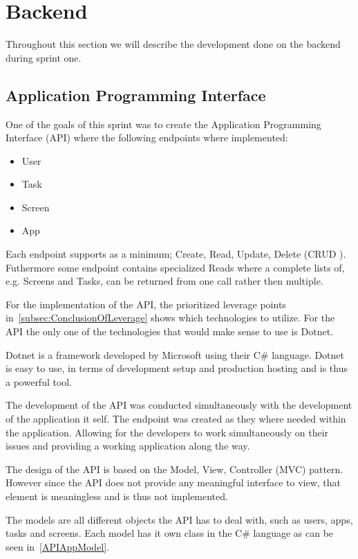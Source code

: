 \section{Backend}

Throughout this section we will describe the development done on the backend during sprint one.

\subsection{Application Programming Interface}

One of the goals of this sprint was to create the Application Programming Interface (API) where the following endpoints where implemented:

\begin{itemize}
    \item User
    \item Task
    \item Screen
    \item App
\end{itemize}

Each endpoint supports as a minimum; Create, Read, Update, Delete (CRUD \cite{CRUD}).
Futhermore some endpoint contains specialized Reads where a complete lists of, e.g. Screens and Tasks, can be returned from one call rather then multiple. 

For the implementation of the API, the prioritized leverage points in~\autoref{subsec:ConclusionOfLeverage} shows which technologies to utilize.
For the API the only one of the technologies that would make sense to use is Dotnet.

Dotnet is a framework developed by Microsoft using their C\# language.
Dotnet is easy to use, in terms of development setup and production hosting and is thus a powerful tool.\cite{DotnetWebsite}

The development of the API was conducted simultaneously with the development of the application it self.
The endpoint was created as they where needed within the application.
Allowing for the developers to work simultaneously on their issues and providing a working application along the way.

The design of the API is based on the Model, View, Controller (MVC) pattern\cite{MVC}.
However since the API does not provide any meaningful interface to view, that element is meaningless and is thus not implemented.

The models are all different objects the API has to deal with, such as users, apps, tasks and screens.
Each model has it own class in the C\# language as can be seen in~\autoref{APIAppModel}.

